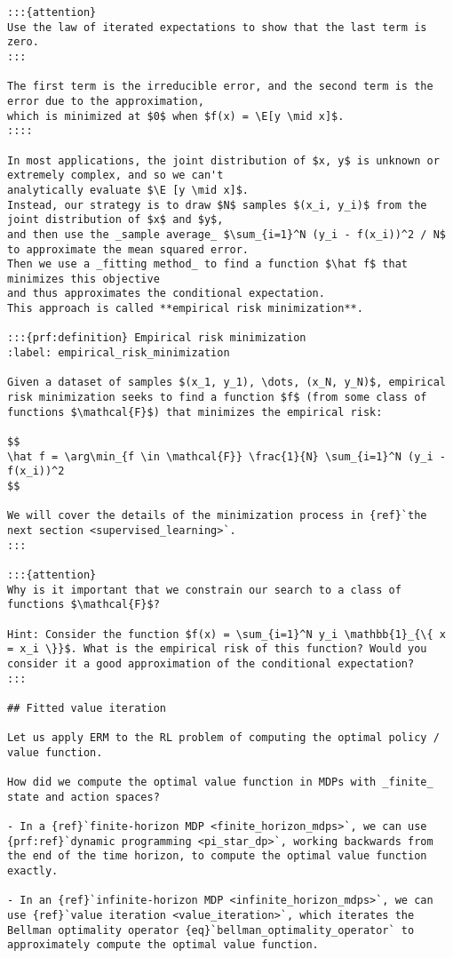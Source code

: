 \begin{verbatim}
:::{attention}
Use the law of iterated expectations to show that the last term is zero.
:::

The first term is the irreducible error, and the second term is the error due to the approximation,
which is minimized at $0$ when $f(x) = \E[y \mid x]$.
::::

In most applications, the joint distribution of $x, y$ is unknown or extremely complex, and so we can't
analytically evaluate $\E [y \mid x]$.
Instead, our strategy is to draw $N$ samples $(x_i, y_i)$ from the joint distribution of $x$ and $y$,
and then use the _sample average_ $\sum_{i=1}^N (y_i - f(x_i))^2 / N$ to approximate the mean squared error.
Then we use a _fitting method_ to find a function $\hat f$ that minimizes this objective
and thus approximates the conditional expectation.
This approach is called **empirical risk minimization**.

:::{prf:definition} Empirical risk minimization
:label: empirical_risk_minimization

Given a dataset of samples $(x_1, y_1), \dots, (x_N, y_N)$, empirical risk minimization seeks to find a function $f$ (from some class of functions $\mathcal{F}$) that minimizes the empirical risk:

$$
\hat f = \arg\min_{f \in \mathcal{F}} \frac{1}{N} \sum_{i=1}^N (y_i - f(x_i))^2
$$

We will cover the details of the minimization process in {ref}`the next section <supervised_learning>`.
:::

:::{attention}
Why is it important that we constrain our search to a class of functions $\mathcal{F}$?

Hint: Consider the function $f(x) = \sum_{i=1}^N y_i \mathbb{1}_{\{ x = x_i \}}$. What is the empirical risk of this function? Would you consider it a good approximation of the conditional expectation?
:::

## Fitted value iteration

Let us apply ERM to the RL problem of computing the optimal policy / value function.

How did we compute the optimal value function in MDPs with _finite_ state and action spaces?

- In a {ref}`finite-horizon MDP <finite_horizon_mdps>`, we can use {prf:ref}`dynamic programming <pi_star_dp>`, working backwards from the end of the time horizon, to compute the optimal value function exactly.

- In an {ref}`infinite-horizon MDP <infinite_horizon_mdps>`, we can use {ref}`value iteration <value_iteration>`, which iterates the Bellman optimality operator {eq}`bellman_optimality_operator` to approximately compute the optimal value function.


\end{verbatim}
